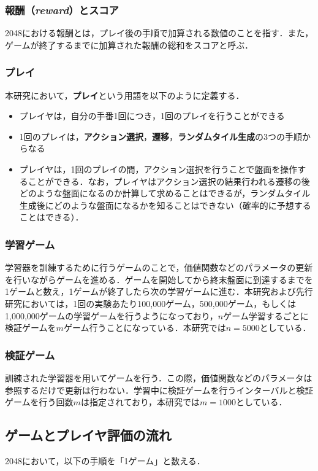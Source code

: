 \documentclass{suribt}
\begin{document}
\subsubsection{報酬（\textit{reward}）とスコア}
2048における報酬とは，プレイ後の手順で加算される数値のことを指す．また，ゲームが終了するまでに加算された報酬の総和をスコアと呼ぶ．

\subsubsection{プレイ}
本研究において，\textbf{プレイ}という用語を以下のように定義する．
\begin{itemize}
\item プレイヤは，自分の手番1回につき，1回のプレイを行うことができる
\item 1回のプレイは，\textbf{アクション選択}，\textbf{遷移}，\textbf{ランダムタイル生成}の3つの手順からなる
\item プレイヤは，1回のプレイの間，アクション選択を行うことで盤面を操作することができる．なお，プレイヤはアクション選択の結果行われる遷移の後どのような盤面になるのか計算して求めることはできるが，ランダムタイル生成後にどのような盤面になるかを知ることはできない（確率的に予想することはできる）．
\end{itemize}

\subsubsection{学習ゲーム}
学習器を訓練するために行うゲームのことで，価値関数などのパラメータの更新を行いながらゲームを進める．ゲームを開始してから終末盤面に到達するまでを1ゲームと数え，1ゲームが終了したら次の学習ゲームに進む．本研究および先行研究においては，1回の実験あたり100,000ゲーム，500,000ゲーム，もしくは1,000,000ゲームの学習ゲームを行うようになっており，$n$ゲーム学習するごとに検証ゲームを$m$ゲーム行うことになっている．本研究では$n=5000$としている．

\subsubsection{検証ゲーム}
訓練された学習器を用いてゲームを行う．この際，価値関数などのパラメータは参照するだけで更新は行わない．学習中に検証ゲームを行うインターバルと検証ゲームを行う回数$m$は指定されており，本研究では$m=1000$としている．

\subsection{ゲームとプレイヤ評価の流れ}
2048において，以下の手順を「1ゲーム」と数える．
\end{document}
